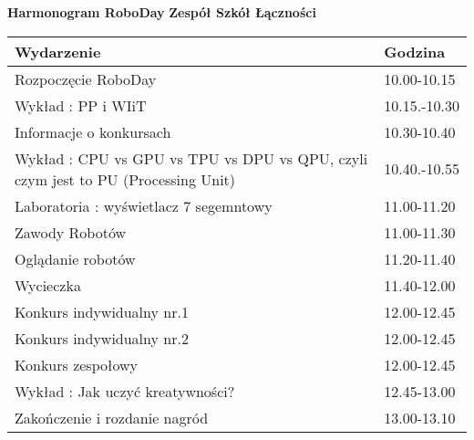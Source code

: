 \documentclass{article}
\begin{document}
\begin{center}
\Large\textbf{Harmonogram RoboDay}
\large\textbf{Zespół Szkół Łączności}
\end{center}
\vspace{1cm}
\begin{center}
\begin{tabular}{|l|l|}
\hline
\textbf{Wydarzenie} & \textbf{Godzina} \\
\hline
Rozpoczęcie RoboDay & 10.00-10.15 \\
\hline
Wykład : PP i WIiT & 10.15.-10.30 \\
\hline
Informacje o konkursach & 10.30-10.40 \\
\hline
Wykład : CPU vs GPU vs TPU vs DPU vs QPU, czyli czym jest to PU (Processing Unit) & 10.40.-10.55 \\
\hline
Laboratoria : wyświetlacz 7 segemntowy & 11.00-11.20 \\
\hline
Zawody Robotów & 11.00-11.30 \\
\hline
Oglądanie robotów & 11.20-11.40 \\
\hline
Wycieczka & 11.40-12.00 \\
\hline
Konkurs indywidualny nr.1 & 12.00-12.45 \\
\hline
Konkurs indywidualny nr.2 & 12.00-12.45 \\
\hline
Konkurs zespołowy & 12.00-12.45 \\
\hline
Wykład : Jak uczyć kreatywności? & 12.45-13.00 \\
\hline
Zakończenie i rozdanie nagród & 13.00-13.10 \\
\hline
\end{tabular}
\end{center}
\end{document}
